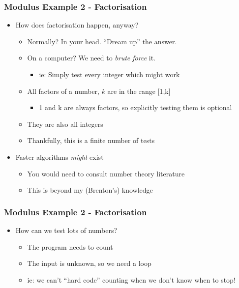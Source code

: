\documentclass[14pt]{beamer}
\begin{document}
\begin{frame}
\frametitle{Modulus Example 2 - Factorisation}
\begin{itemize}
\item How does factorisation happen, anyway?
	\begin{itemize}
		\item Normally? In your head. ``Dream up'' the answer.
		\item On a computer? We need to \textit{brute force} it.
			\begin{itemize}
				\item ie: Simply test every integer which might work	
			\end{itemize}
		\item All factors of a number, $k$ are in the range [1,k]
			\begin{itemize}
				\item 1 and k are always factors, so explicitly testing them is optional
			\end{itemize}
		\item They are also all integers
		\item Thankfully, this is a finite number of tests
	\end{itemize}
\item Faster algorithms \textit{might} exist
	\begin{itemize}
		\item You would need to consult number theory literature
		\item This is beyond my (Brenton's) knowledge
	\end{itemize}
\end{itemize}
\end{frame}

\begin{frame}
\frametitle{Modulus Example 2 - Factorisation}
\begin{itemize}
\item How can we test lots of numbers?
	\begin{itemize}
		\item The program needs to count
		\item The input is unknown, so we need a loop
		\item ie: we can't ``hard code'' counting when  we don't know when to stop!
	\end{itemize}
\end{itemize}
\end{frame}
\end{document}
